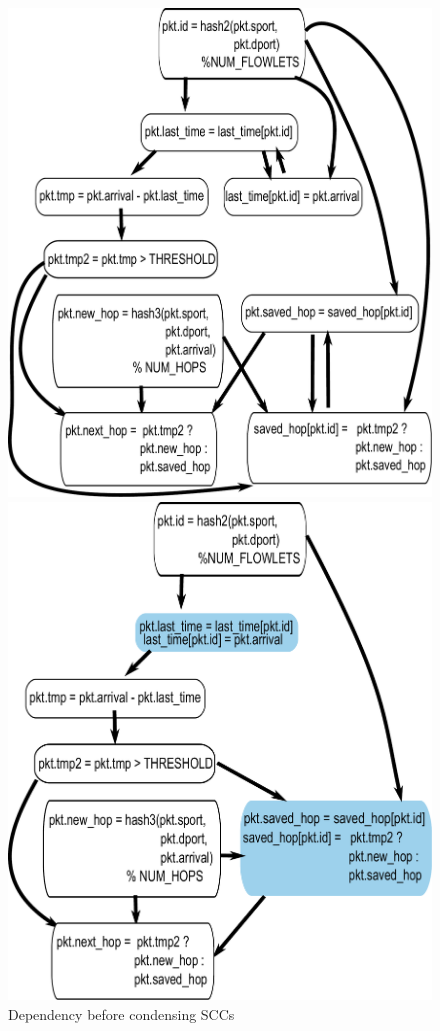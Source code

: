 \begin{figure}[!t]
\begin{minipage}{0.5\textwidth}
  \includegraphics[width=\columnwidth]{deps.pdf}
  \caption{Dependency before condensing SCCs}
  \label{fig:partitioning_before}
\end{minipage}
%
\vrule\quad
%
\begin{minipage}{0.5\textwidth}
\includegraphics[width=\columnwidth]{scc.pdf}

\end{minipage}
\end{figure}
